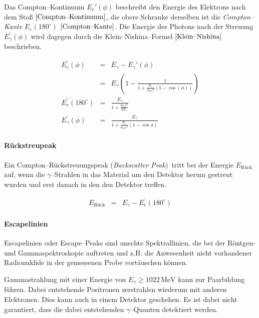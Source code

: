 \documentclass[12pt,a4paper]{scrartcl}
\numberwithin{equation}{section} %
\newcommand{\pu}[1]{\ensuremath{\mathrm{#1}}}
\begin{document}
Das Compton--Kontinuum $E_e'(\phi)$ beschreibt den Energie des Elektrons nach dem Stoß $\eqref{Compton--Kontinuum}$, die obere Schranke derselben ist die \emph{Compton--Kante} $E_e(180^\circ)$ $\eqref{Compton--Kante}$. Die Energie des Photons nach der Streuung $E_{\gamma}^\prime(\phi)$ wird dagegen durch die Klein--Nishina--Formel $\eqref{Klein--Nishina}$ beschrieben.

\begin{eqnarray}
    E_e^\prime(\phi)
        &=& E_{\gamma} - E_{\gamma}'(\phi) \\
        &=& E_{\gamma}
            \left(
                1-
                \frac{1}{1+\frac{E_{\gamma}}{m_\mathrm ec^2}
                    (1-\cos(\phi))}
            \right) \label{Compton--Kontinuum} \\
    E_e^\prime(180^\circ) &=& \frac{E_\gamma}{1+\frac{m_ec^2}{2E_\gamma}}
        \label{Compton--Kante} \\
    E_{\gamma}^\prime(\phi)
        &=& \frac{E_{\gamma}}{1+\frac{E_{\gamma}}{m_\mathrm ec^2}
            (1-\cos\phi)} \label{Klein--Nishina}
\end{eqnarray}

\paragraph{Rückstreupeak}

Ein Compton--Rückstreuungspeak (\emph{Backscatter Peak})~tritt bei der Energie $E_\mathrm{Rück}$ auf, wenn die $\gamma$--Strahlen in das Material um den Detektor herum gestreut wurden und erst danach in den
den Detektor treffen. \cite{Bethge}

\begin{eqnarray}
    E_\mathrm{Rück} &=& E_\gamma - E_e^\prime(180^\circ)
\end{eqnarray}

\paragraph{Escapelinien}

Escapelinien oder Escape--Peaks sind unechte Spektrallinien, die bei der Röntgen- und Gammaspektroskopie auftreten und z.B. die Anwesenheit nicht vorhandener Radionuklide in der gemessenen Probe vortäuschen können. \cite{Escapelinie}

Gammastrahlung mit einer Energie von $E_\gamma\ge\pu{1022\,MeV}$ kann zur Paarbildung führen. Dabei entstehende Positronen zerstrahlen wiederum mit anderen Elektronen. Dies kann auch in einem Detektor geschehen. Es ist dabei nicht garantiert, dass die dabei entstehenden $\gamma$--Quanten detektiert werden. \cite{Bethge}
\end{document}
